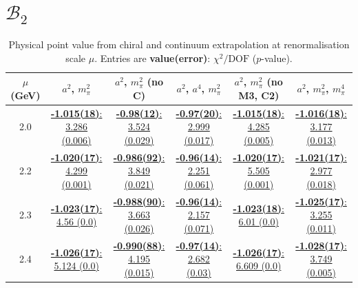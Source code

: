 \documentclass[12pt]{extarticle}
\begin{document}
\section{$\mathcal{B}_2$}
\begin{table}[h!]
\begin{center}
\begin{tabular}{|c|c|c|c|c|c|}
\hline
$\mu$ (GeV) & $a^2$, $m_\pi^2$& $a^2$, $m_\pi^2$ (no C)& $a^2$, $a^4$, $m_\pi^2$& $a^2$, $m_\pi^2$ (no M3, C2)& $a^2$, $m_\pi^2$, $m_\pi^4$\\
\hline
2.0& \hyperlink{VVmAA/NPR/a2m2_20.pdf.1}{\textbf{-1.015(18)}: 3.286 (0.006)} & \hyperlink{VVmAA/NPR/a2m2noC_20.pdf.1}{\textbf{-0.98(12)}: 3.524 (0.029)} & \hyperlink{VVmAA/NPR/a2a4m2_20.pdf.1}{\textbf{-0.97(20)}: 2.999 (0.017)} & \hyperlink{VVmAA/NPR/a2m2mcut_20.pdf.1}{\textbf{-1.015(18)}: 4.285 (0.005)} & \hyperlink{VVmAA/NPR/a2m2m4_20.pdf.1}{\textbf{-1.016(18)}: 3.177 (0.013)}\\
2.2& \hyperlink{VVmAA/NPR/a2m2_22.pdf.1}{\textbf{-1.020(17)}: 4.299 (0.001)} & \hyperlink{VVmAA/NPR/a2m2noC_22.pdf.1}{\textbf{-0.986(92)}: 3.849 (0.021)} & \hyperlink{VVmAA/NPR/a2a4m2_22.pdf.1}{\textbf{-0.96(14)}: 2.251 (0.061)} & \hyperlink{VVmAA/NPR/a2m2mcut_22.pdf.1}{\textbf{-1.020(17)}: 5.505 (0.001)} & \hyperlink{VVmAA/NPR/a2m2m4_22.pdf.1}{\textbf{-1.021(17)}: 2.977 (0.018)}\\
2.3& \hyperlink{VVmAA/NPR/a2m2_23.pdf.1}{\textbf{-1.023(17)}: 4.56 (0.0)} & \hyperlink{VVmAA/NPR/a2m2noC_23.pdf.1}{\textbf{-0.988(90)}: 3.663 (0.026)} & \hyperlink{VVmAA/NPR/a2a4m2_23.pdf.1}{\textbf{-0.96(14)}: 2.157 (0.071)} & \hyperlink{VVmAA/NPR/a2m2mcut_23.pdf.1}{\textbf{-1.023(18)}: 6.01 (0.0)} & \hyperlink{VVmAA/NPR/a2m2m4_23.pdf.1}{\textbf{-1.025(17)}: 3.255 (0.011)}\\
2.4& \hyperlink{VVmAA/NPR/a2m2_24.pdf.1}{\textbf{-1.026(17)}: 5.124 (0.0)} & \hyperlink{VVmAA/NPR/a2m2noC_24.pdf.1}{\textbf{-0.990(88)}: 4.195 (0.015)} & \hyperlink{VVmAA/NPR/a2a4m2_24.pdf.1}{\textbf{-0.97(14)}: 2.682 (0.03)} & \hyperlink{VVmAA/NPR/a2m2mcut_24.pdf.1}{\textbf{-1.026(17)}: 6.609 (0.0)} & \hyperlink{VVmAA/NPR/a2m2m4_24.pdf.1}{\textbf{-1.028(17)}: 3.749 (0.005)}\\
\hline
\end{tabular}
\caption{Physical point value from chiral and continuum extrapolation at renormalisation scale $\mu$. Entries are \textbf{value(error)}: $\chi^2/\text{DOF}$ ($p$-value).}
\end{center}
\end{table}
\end{document}
